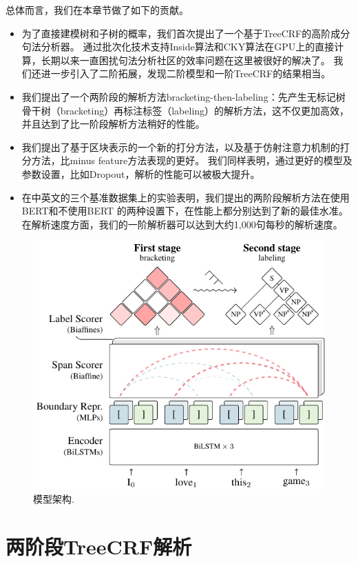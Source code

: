 总体而言，我们在本章节做了如下的贡献。
\begin{itemize}
	\item 为了直接建模树和子树的概率，我们首次提出了一个基于TreeCRF的高阶成分句法分析器。
	      通过批次化技术支持Inside算法和CKY算法在GPU上的直接计算，长期以来一直困扰句法分析社区的效率问题在这里被很好的解决了。
	      我们还进一步引入了二阶拓展，发现二阶模型和一阶TreeCRF的结果相当。
	\item 我们提出了一个两阶段的解析方法bracketing-then-labeling：先产生无标记树骨干树（bracketing）再标注标签（labeling）的解析方法，这不仅更加高效，并且达到了比一阶段解析方法稍好的性能。
	\item 我们提出了基于区块表示的一个新的打分方法，以及基于仿射注意力机制的打分方法，比minus feature方法表现的更好。
	      我们同样表明，通过更好的模型及参数设置，比如Dropout，解析的性能可以被极大提升。
	\item 在中英文的三个基准数据集上的实验表明，我们提出的两阶段解析方法在使用BERT和不使用BERT \citep{devlin-etal-2019-bert}的两种设置下，在性能上都分别达到了新的最佳水准。
	      在解析速度方面，我们的一阶解析器可以达到大约1,000句每秒的解析速度。
\end{itemize}

\begin{figure}[tb]
	\centering
	\includegraphics [scale=1.1]{figures/con-framework.pdf}
	\caption{模型架构.}
	\label{fig:con-framework}
\end{figure}

\section{两阶段TreeCRF解析}\label{sec:2stage-parsing}

